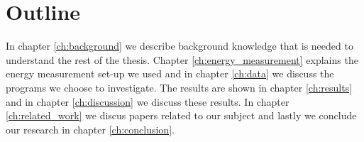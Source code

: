 \section{Outline}
In chapter \ref{ch:background} we describe background knowledge that is needed to understand the rest of the thesis. Chapter \ref{ch:energy_measurement} explains the energy measurement set-up we used and in chapter \ref{ch:data} we discuss the programs we choose to investigate. The results are shown in chapter \ref{ch:results} and in chapter \ref{ch:discussion} we discuss these results. In chapter \ref{ch:related_work} we discus papers related to our subject and lastly we conclude our research in chapter \ref{ch:conclusion}.

